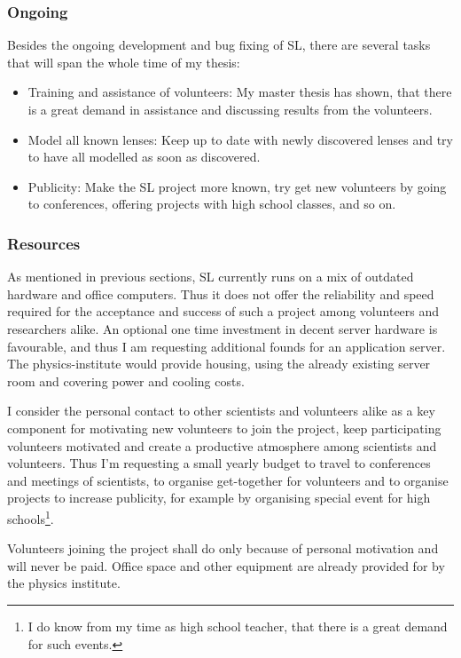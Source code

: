 \documentclass[11pt]{article}
\begin{document}
\subsubsection{Ongoing}
\label{sec:ongoing}

Besides the ongoing development and bug fixing of SL, there are several tasks that will span the whole time of my thesis:
\begin{itemize}
  \item Training and assistance of volunteers: My master thesis has shown, that there is a great demand in assistance and discussing results from the volunteers.
  \item Model all known lenses: Keep up to date with newly discovered lenses and try to have all modelled as soon as discovered.
  \item Publicity: Make the SL project more known, try get new volunteers by going to conferences, offering projects with high school classes, and so on.
\end{itemize}


\subsubsection{Resources}

As mentioned in previous sections, SL currently runs on a mix of outdated hardware and office computers.
Thus it does not offer the reliability and speed required for the acceptance and success of such a project among volunteers and researchers alike.
An optional one time investment in decent server hardware is favourable, and thus I am requesting additional founds for an application server.
The physics-institute would provide housing, using the already existing server room and covering power and cooling costs.

I consider the personal contact to other scientists and volunteers alike as a key component for motivating new volunteers to join the project, keep participating volunteers motivated and create a productive atmosphere among scientists and volunteers.
Thus I'm requesting a small yearly budget to travel to conferences and meetings of scientists, to organise get-together for volunteers and to organise projects to increase publicity, for example by organising special event for high schools\footnote{I do know from my time as high school teacher, that there is a great demand for such events.}.

Volunteers joining the project shall do only because of personal motivation and will never be paid.
Office space and other equipment are already provided for by the physics institute.
\end{document}
